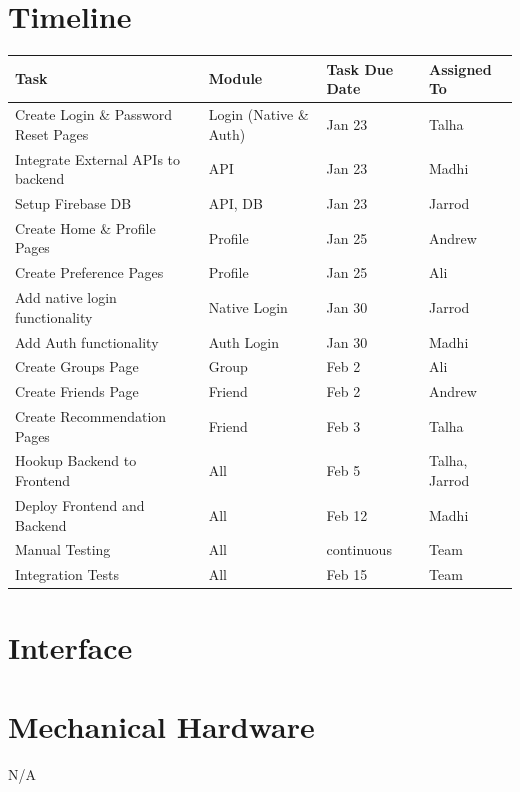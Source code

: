 \documentclass[12pt, titlepage]{article}
\begin{document}
\section{Timeline}
\begin{tabularx}{\textwidth}{|X|p{4cm}|p{2cm}|p{2cm}|}
	\hline
	{\bf Task} & {\bf Module} & {\bf Task Due Date} & {\bf Assigned To} \\
	\hline
	Create Login \& Password Reset Pages & Login (Native \& Auth) & Jan 23 & Talha\\
	\hline
	Integrate External APIs to backend & API & Jan 23 & Madhi\\
	\hline
	Setup Firebase DB & API, DB & Jan 23 & Jarrod\\
	\hline
	Create Home \& Profile Pages & Profile & Jan 25 & Andrew\\
	\hline
	Create Preference Pages & Profile & Jan 25 & Ali\\
	\hline
	Add native login functionality & Native Login & Jan 30 & Jarrod\\
	\hline
	Add Auth functionality & Auth Login & Jan 30 & Madhi\\
	\hline
	Create Groups Page & Group & Feb 2 & Ali\\
	\hline
	Create Friends Page & Friend & Feb 2 & Andrew\\
	\hline
	Create Recommendation Pages & Friend & Feb 3 & Talha\\
	\hline
	Hookup Backend to Frontend & All & Feb 5 & Talha, Jarrod\\
	\hline
	Deploy Frontend and Backend & All & Feb 12 & Madhi\\
	\hline
	Manual Testing & All & continuous & Team\\
	\hline
	Integration Tests & All & Feb 15 & Team\\
	\hline
\end{tabularx}

% 

\newpage{}

\appendix

\section{Interface}


\section{Mechanical Hardware}
N/A
\end{document}
